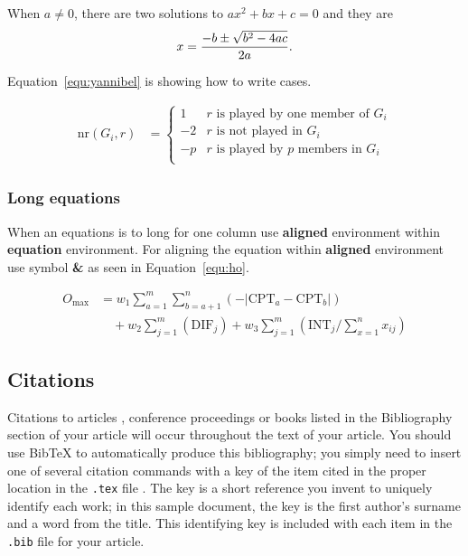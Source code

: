 \documentclass[article]{stucosrec}
\begin{document}
	When $a \ne 0$, there are two solutions to $ax^2 + bx + c = 0$ and they are $$x = {-b \pm \sqrt{b^2-4ac} \over 2a}.$$
	
	Equation~\ref{equ:yannibel} is showing how to write cases.
	
	\begin{equation}
		\begin{aligned} 
			\mathrm{nr}(G_i,r) & = \label{equ:yannibel}
			\begin{cases}
				1  & \text{$r$ is played by one member of $G_i$}\\
				-2 & \text{$r$ is not played in $G_i$} \\
				-p & \text{$r$ is played by $p$ members in $G_i$}\\
			\end{cases}
		\end{aligned}
	\end{equation}
	
	\subsubsection{Long equations}
	
	When an equations is to long for one column use \textbf{aligned} environment within \textbf{equation} environment.
	For aligning the equation within \textbf{aligned} environment use symbol \textbf{\&} as seen in Equation~\ref{equ:ho}.
	
	\begin{equation}
		\begin{aligned}
			O_{\max}& = w_1 \sum_{a=1}^{m} \sum_{b=a+1}^{n} (-\lvert\text{CPT}_a 
			-\text{CPT}_b\rvert)\\ 
			&\quad + w_2 \sum_{j=1}^{m} (\text{DIF}_j) + w_3 \sum_{j=1}^{m} 
			(\text{INT}_j/\sum_{x=1}^{n} x_{ij})
		\end{aligned}
		\label{equ:ho}
	\end{equation}
	
	\subsection{Citations}
	
	Citations to articles \cite{bowman:reasoning, clark:pct, braams:babel, herlihy:methodology}, conference proceedings \cite{clark:pct} or books \cite{salas:calculus, Lamport:LaTeX} listed
	in the Bibliography section of your article will occur throughout the text of your article.
	You should use BibTeX to automatically produce this bibliography; you simply need to insert one of several citation commands with a key of the item cited in the proper location in the \texttt{.tex} file \cite{Lamport:LaTeX}.
	The key is a short reference you invent to uniquely identify each work; in this sample document, the key is the first author's surname and a word from the title.
	This identifying key is included with each item in the \texttt{.bib} file for your article.
	
\end{document}
